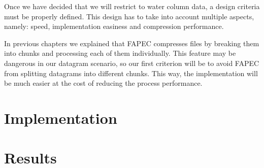 Once we have decided that we will restrict to water column data, a design criteria must be properly defined. This design has to take into account multiple aspects, namely: speed, implementation easiness and compression performance.

In previous chapters we explained that FAPEC compresses files by breaking them into chunks and processing each of them individually. This feature may be dangerous in our datagram scenario, so our first criterion will be to avoid FAPEC from splitting datagrams into different chunks. This way, the implementation will be much easier at the cost of reducing the process performance.

\section{Implementation}

\section{Results}

